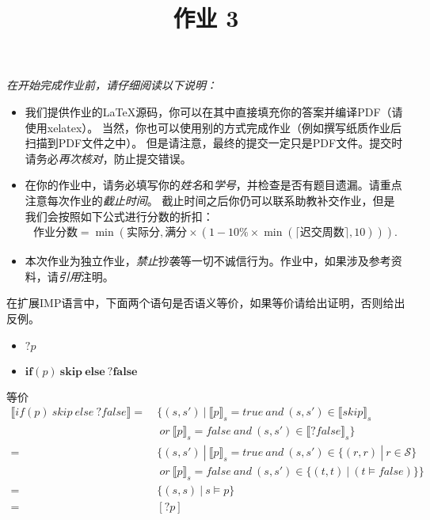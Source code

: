 \documentclass[11pt,a4paper]{article}
\title{作业 3}
\begin{document}
\maketitle

\textit{在开始完成作业前，请仔细阅读以下说明：}
\begin{itemize}
    \item 我们提供作业的\LaTeX 源码，你可以在其中直接填充你的答案并编译PDF（请使用xelatex）。
    当然，你也可以使用别的方式完成作业（例如撰写纸质作业后扫描到PDF文件之中）。
    但是请注意，最终的提交一定只是PDF文件。提交时请务必\emph{再次核对}，防止提交错误。
    \item 在你的作业中，请务必填写你的\emph{姓名}和\emph{学号}，并检查是否有题目遗漏。请重点注意每次作业的\emph{截止时间}。
    截止时间之后你仍可以联系助教补交作业，但是我们会按照如下公式进行分数的折扣：
    \begin{align*}
        \text{作业分数} = \min\left(\text{实际分}, \text{满分}\times\left(1 - 10\%\times\min\left(\lceil\text{迟交周数}\rceil, 10\right)\right)\right).
    \end{align*}
    \item 本次作业为独立作业，\emph{禁止}抄袭等一切不诚信行为。作业中，如果涉及参考资料，请\emph{引用}注明。
\end{itemize}



\subproblem 在扩展IMP语言中，下面两个语句是否语义等价，如果等价请给出证明，否则给出反例。
\begin{itemize}
    \item $?p$
    \item $\textbf{if}(p)\ \textbf{skip}\ \textbf{else}\ ?\textbf{false}$
\end{itemize}
\begin{solution}
    等价
    \begin{align*}
    	\llbracket{if(p)\ skip\ else\ ?false}\rrbracket =\ & \{(s,s')\ |\ \llbracket{p}\rrbracket_s=true\ and\ (s,s')\in\llbracket{skip}\rrbracket_s\\
		&\ or\ \llbracket{p}\rrbracket_s=false\ and \ (s,s')\in\llbracket{?false}\rrbracket_s\}\\
		=\ & \{(s,s')\ |\ \llbracket{p}\rrbracket_s=true\ and\ (s,s')\in \{(r,r)\ |\ r\in \mathcal{S}\}\\
		&\ or\ \llbracket{p}\rrbracket_s=false\ and \ (s,s')\in\{(t,t)\ |\ (t\models false)\}\}\\
		=\ &\{(s,s)\ |\ s\models p\} \\
		=\ &[?p]
    \end{align*}
\end{solution}
\end{document}
